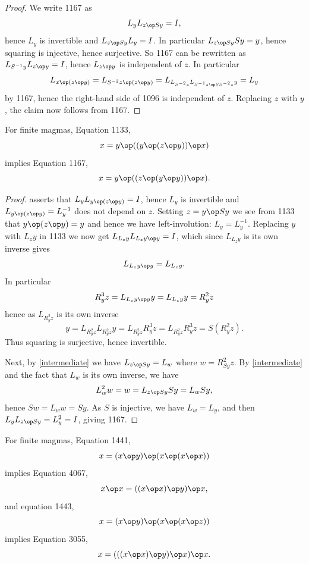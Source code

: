 \begin{proof}\leanok We write 1167 as
  $$ L_y L_{z \op Sy} = I,$$
hence $L_y$ is invertible and $L_{z \op Sy} L_y = I$.  In particular $L_{z \op Sy} Sy = y$, hence squaring is injective, hence surjective.  So 1167 can be rewritten as $L_{S^{-1} y} L_{z \op y} = I$, hence $L_{z \op y}$ is independent of $z$.  In particular
$$ L_{x \op (z \op y)} = L_{S^{-2} z \op (z \op y)} = L_{L_{S^{-2} z} L_{S^{-1} z \op S S^{-2} z} y} = L_y$$
by 1167, hence the right-hand side of 1096 is independent of $z$.  Replacing $z$ with $y$, the claim now follows from 1167.
\end{proof}

\begin{proposition}[1133 implies 1167]\label{1133-1167}\leanok{}
  For finite magmas, Equation 1133,
$$ x = y \op ((y \op (z \op y)) \op x)$$
implies Equation 1167,
  $$ x = y \op ((z \op (y \op y)) \op x).$$
\end{proposition}

\begin{proof} asserts that $L_y L_{y \op (z \op y)} = I$, hence $L_y$ is invertible and $L_{y \op (z \op y)} = L_y^{-1}$ does not depend on $z$.  Setting $z = y \op Sy$ we see from 1133 that $y \op (z \op y) = y$ and hence we have left-involution: $L_y = L_y^{-1}$. Replacing $y$ with $L_z y$ in 1133 we now get $L_{L_z y} L_{L_z y \op y} = I$, which since $L_{L_z y}$ is its own inverse gives
\begin{equation}\label{intermediate}
  L_{L_z y \op y} = L_{L_z y}.
\end{equation}
In particular
$$ R_y^3 z = L_{L_z y \op y} y = L_{L_z y} y = R_y^2 z$$
hence as $L_{R_y^2 z}$ is its own inverse
$$ y =L_{R_y^2 z} L_{R_y^2 z} y = L_{R_y^2 z} R_y^3 z =
L_{R_y^2 z} R_y^3 z = S( R_y^2 z).$$
Thus squaring is surjective, hence invertible.

Next, by \eqref{intermediate} we have $L_{z \op Sy} = L_w$ where $w = R_{Sy}^2 z$.  By \eqref{intermediate} and the fact that $L_w$ is its own inverse, we have
$$ L_w^2 w = w = L_{z \op Sy} Sy =L_w Sy,$$
hence $Sw = L_w w = Sy$.  As $S$ is injective, we have $L_w = L_y$, and then $L_y L_{z \op Sy} = L_y^2 = I$, giving 1167.
\end{proof}

\begin{proposition}\label{1441-4067-1443-3055}\leanok{}
  For finite magmas, Equation 1441,
$$ x = (x \op y) \op (x \op (x \op x))$$
implies Equation 4067,
$$ x \op x = ((x \op x) \op y) \op x,$$
and equation 1443,
$$ x = (x \op y) \op (x \op (x \op z))$$
implies Equation 3055,
$$ x = (((x \op x) \op y) \op x) \op x.$$
\end{proposition}

